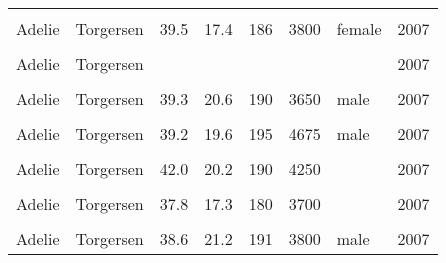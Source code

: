 \documentclass[
  landscape]{article}
\begin{document}
\begin{longtable}[l]{llllllll}
\endfoot
\bottomrule
\endlastfoot
\cellcolor{gray!15}{Adelie} & \cellcolor{gray!15}{Torgersen} & \cellcolor{gray!15}{39.1} & \cellcolor{gray!15}{18.7} & \cellcolor{gray!15}{181} & \cellcolor{gray!15}{3750} & \cellcolor{gray!15}{male} & \cellcolor{gray!15}{2007}\\
Adelie & Torgersen & 39.5 & 17.4 & 186 & 3800 & female & 2007\\
\cellcolor{gray!15}{Adelie} & \cellcolor{gray!15}{Torgersen} & \cellcolor{gray!15}{40.3} & \cellcolor{gray!15}{18.0} & \cellcolor{gray!15}{195} & \cellcolor{gray!15}{3250} & \cellcolor{gray!15}{female} & \cellcolor{gray!15}{2007}\\
Adelie & Torgersen &  &  &  &  &  & 2007\\
\cellcolor{gray!15}{Adelie} & \cellcolor{gray!15}{Torgersen} & \cellcolor{gray!15}{36.7} & \cellcolor{gray!15}{19.3} & \cellcolor{gray!15}{193} & \cellcolor{gray!15}{3450} & \cellcolor{gray!15}{female} & \cellcolor{gray!15}{2007}\\
Adelie & Torgersen & 39.3 & 20.6 & 190 & 3650 & male & 2007\\
\cellcolor{gray!15}{Adelie} & \cellcolor{gray!15}{Torgersen} & \cellcolor{gray!15}{38.9} & \cellcolor{gray!15}{17.8} & \cellcolor{gray!15}{181} & \cellcolor{gray!15}{3625} & \cellcolor{gray!15}{female} & \cellcolor{gray!15}{2007}\\
Adelie & Torgersen & 39.2 & 19.6 & 195 & 4675 & male & 2007\\
\cellcolor{gray!15}{Adelie} & \cellcolor{gray!15}{Torgersen} & \cellcolor{gray!15}{34.1} & \cellcolor{gray!15}{18.1} & \cellcolor{gray!15}{193} & \cellcolor{gray!15}{3475} & \cellcolor{gray!15}{} & \cellcolor{gray!15}{2007}\\
Adelie & Torgersen & 42.0 & 20.2 & 190 & 4250 &  & 2007\\
\cellcolor{gray!15}{Adelie} & \cellcolor{gray!15}{Torgersen} & \cellcolor{gray!15}{37.8} & \cellcolor{gray!15}{17.1} & \cellcolor{gray!15}{186} & \cellcolor{gray!15}{3300} & \cellcolor{gray!15}{} & \cellcolor{gray!15}{2007}\\
Adelie & Torgersen & 37.8 & 17.3 & 180 & 3700 &  & 2007\\
\cellcolor{gray!15}{Adelie} & \cellcolor{gray!15}{Torgersen} & \cellcolor{gray!15}{41.1} & \cellcolor{gray!15}{17.6} & \cellcolor{gray!15}{182} & \cellcolor{gray!15}{3200} & \cellcolor{gray!15}{female} & \cellcolor{gray!15}{2007}\\
Adelie & Torgersen & 38.6 & 21.2 & 191 & 3800 & male & 2007\\

\end{longtable}
\end{document}
